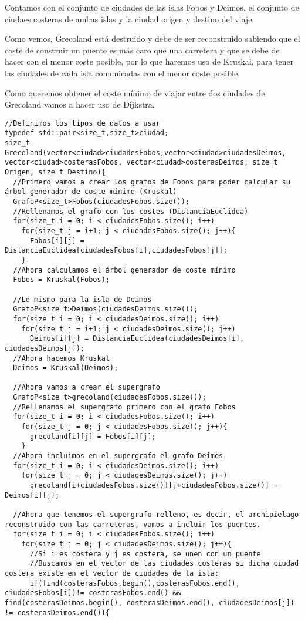 Contamos con el conjunto de ciudades de las islas Fobos y Deimos, el conjunto de ciudaes costeras de ambas islas y la ciudad origen y destino del viaje.

Como vemos, Grecoland está destruido y debe de ser reconstruido sabiendo que el coste de construir un puente es más caro que una carretera y que se debe de hacer con el menor coste posible, por lo que haremos uso de Kruskal, para tener las ciudades de cada isla comunicadas con el menor coste posible.

Como queremos obtener el coste mínimo de viajar entre dos ciudades de Grecoland vamos a hacer uso de Dijkstra.
\begin{verbatim}
//Definimos los tipos de datos a usar
typedef std::pair<size_t,size_t>ciudad;
size_t Grecoland(vector<ciudad>ciudadesFobos,vector<ciudad>ciudadesDeimos, vector<ciudad>costerasFobos, vector<ciudad>costerasDeimos, size_t Origen, size_t Destino){
  //Primero vamos a crear los grafos de Fobos para poder calcular su árbol generador de coste mínimo (Kruskal)
  GrafoP<size_t>Fobos(ciudadesFobos.size());
  //Rellenamos el grafo con los costes (DistanciaEuclidea)
  for(size_t i = 0; i < ciudadesFobos.size(); i++)
    for(size_t j = i+1; j < ciudadesFobos.size(); j++){
      Fobos[i][j] = DistanciaEuclidea[ciudadesFobos[i],ciudadesFobos[j]];
    }
  //Ahora calculamos el árbol generador de coste mínimo
  Fobos = Kruskal(Fobos);

  //Lo mismo para la isla de Deimos
  GrafoP<size_t>Deimos(ciudadesDeimos.size());
  for(size_t i = 0; i < ciudadesDeimos.size(); i++)
    for(size_t j = i+1; j < ciudadesDeimos.size(); j++)
      Deimos[i][j] = DistanciaEuclidea(ciudadesDeimos[i], ciudadesDeimos[j]);
  //Ahora hacemos Kruskal
  Deimos = Kruskal(Deimos);

  //Ahora vamos a crear el supergrafo
  GrafoP<size_t>grecoland(ciudadesFobos.size());
  //Rellenamos el supergrafo primero con el grafo Fobos
  for(size_t i = 0; i < ciudadesFobos.size(); i++)
    for(size_t j = 0; j < ciudadesFobos.size(); j++){
      grecoland[i][j] = Fobos[i][j];
    }
  //Ahora incluimos en el supergrafo el grafo Deimos
  for(size_t i = 0; i < ciudadesDeimos.size(); i++)
    for(size_t j = 0; j < ciudadesDeimos.size(); j++)
      grecoland[i+ciudadesFobos.size()][j+ciudadesFobos.size()] = Deimos[i][j];
  
  //Ahora que tenemos el supergrafo relleno, es decir, el archipielago reconstruido con las carreteras, vamos a incluir los puentes.
  for(size_t i = 0; i < ciudadesFobos.size(); i++)
    for(size_t j = 0; j < ciudadesDeimos.size(); j++){
      //Si i es costera y j es costera, se unen con un puente
      //Buscamos en el vector de las ciudades costeras si dicha ciudad costera existe en el vector de ciudades de la isla:
      if(find(costerasFobos.begin(),costerasFobos.end(), ciudadesFobos[i])!= costerasFobos.end() &&                                                                                                   find(costerasDeimos.begin(), costerasDeimos.end(), ciudadesDeimos[j]) != costerasDeimos.end()){


\end{verbatim}
